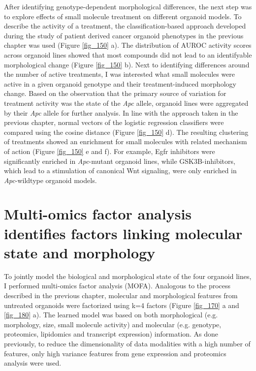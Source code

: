 \begin{flushleft}
After identifying genotype-dependent morphological differences, the next step was to explore effects of small molecule treatment on different organoid models. To describe the activity of a treatment, the classification-based approach developed during the study of patient derived cancer organoid phenotypes in the previous chapter was used (Figure \ref{fig_150} a). The distribution of AUROC activity scores across organoid lines showed that most compounds did not lead to an identifyable morphological change (Figure \ref{fig_150} b). Next to identifying differences around the number of active treatments, I was interested what small molecules were active in a given organoid genotype and their treatment-induced morphology change. Based on the observation that the primary source of variation for treatment activity was the state of the \textit{Apc} allele, organoid lines were aggregated by their \textit{Apc} allele for further analysis. In line with the approach taken in the previous chapter, normal vectors of the logistic regression classifiers were compared using the cosine distance (Figure \ref{fig_150} d). The resulting clustering of treatments showed an enrichment for small molecules with related mechanism of action (Figure \ref{fig_150} e and f). For example, Egfr inhibitors were significantly enriched in \textit{Apc}-mutant organoid lines, while GSK3B-inhibitors, which lead to a stimulation of canonical Wnt signaling, were only enriched in \textit{Apc}-wildtype organoid models. 

\clearpage
\section{Multi-omics factor analysis identifies factors linking molecular state and morphology}

To jointly model the biological and morphological state of the four organoid lines, I performed multi-omics factor analysis (MOFA). Analogous to the process described in the previous chapter, molecular and morphological features from untreated organoids were factorized using k=4 factors (Figure \ref{fig_170} a and \ref{fig_180} a). The learned model was based on both morphological (e.g. morphology, size, small molecule activity) and molecular (e.g. genotype, proteomics, lipidomics and transcript expression) information. As done previously, to reduce the dimensionality of data modalities with a high number of features, only high variance features from gene expression and proteomics analysis were used.


\end{flushleft}
